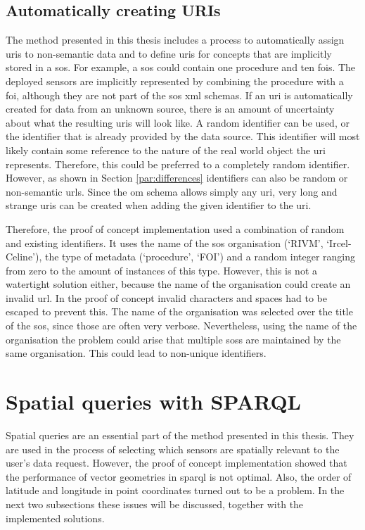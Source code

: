 \subsection{Automatically creating URIs}
The method presented in this thesis includes a process to automatically assign \acp{uri} to non-semantic data and to define \acp{uri} for concepts that are implicitly stored in a \ac{sos}. For example, a \ac{sos} could contain one procedure and ten \acp{foi}. The deployed sensors are implicitly represented by combining the procedure with a \ac{foi}, although they are not part of the \ac{sos} \ac{xml} schemas. If an \ac{uri} is automatically created for data from an unknown source, there is an amount of uncertainty about what the resulting \acp{uri} will look like. A random identifier can be used, or the identifier that is already provided by the data source. This identifier will most likely contain some reference to the nature of the real world object the \ac{uri} represents. Therefore, this could be preferred to a completely random identifier. However, as shown in Section \ref{par:differences} identifiers can also be random or non-semantic \acp{url}. Since the \ac{om} schema allows simply any \ac{uri}, very long and strange \acp{uri} can be created when adding the given identifier to the \ac{uri}. 

Therefore, the proof of concept implementation used a combination of random and existing identifiers. It uses the name of the \ac{sos} organisation (`RIVM', `Ircel-Celine'), the type of metadata (`procedure', `FOI') and a random integer ranging from zero to the amount of instances of this type. However, this is not a watertight solution either, because the name of the organisation could create an invalid \ac{url}. In the proof of concept invalid characters and spaces had to be escaped to prevent this. The name of the organisation was selected over the title of the \ac{sos}, since those are often very verbose. Nevertheless, using the name of the organisation the problem could arise that multiple \aclp{sos} are maintained by the same organisation. This could lead to non-unique identifiers. 

\section{Spatial queries with SPARQL}
\label{par:spQueries}
Spatial queries are an essential part of the method presented in this thesis. They are used in the process of selecting which sensors are spatially relevant to the user's data request. However, the proof of concept implementation showed that the performance of vector geometries in \ac{sparql} is not optimal. Also, the order of latitude and longitude in point coordinates turned out to be a problem. In the next two subsections these issues will be discussed, together with the implemented solutions.     

